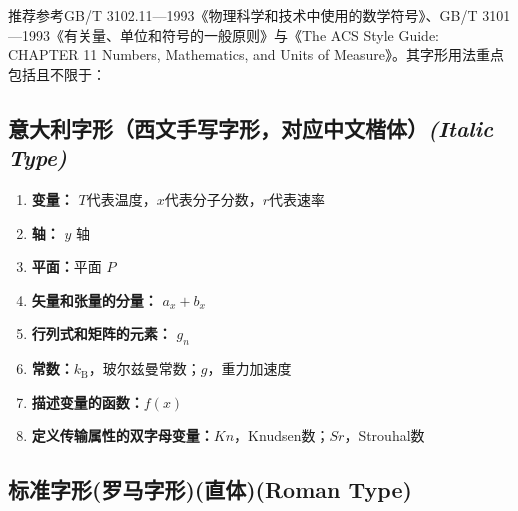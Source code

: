 推荐参考GB/T 3102.11—1993《物理科学和技术中使用的数学符号\cite{QuanGuoLiang1993WuLiKeXueHeJiShuZhongShiYongDeShuXueFuHao}》、GB/T 3101—1993《有关量、单位和符号的一般原则\cite{QuanGuoLiang1993YouGuanLiangDanWeiHeFuHaoDeYiBanYuanZe}》与《The ACS Style Guide: CHAPTER 11 Numbers, Mathematics, and Units of Measure\cite{Cog2006ACSStyleGuide}》。其字形用法重点包括且不限于：

\subsection{{\kai 意大利字形（西文手写字形，对应中文楷体）}\textit{(Italic Type)}}  

\begin{enumerate}[label=(\arabic*)]
    \item \textbf{变量：} $T$代表温度，$x$代表分子分数，$r$代表速率
    \item \textbf{轴：} $y$ 轴
    \item \textbf{平面：}平面 $P$
    \item \textbf{矢量和张量的分量：} $a_x + b_x$
    \item \textbf{行列式和矩阵的元素：} $g_n$
    \item \textbf{常数：}$k_\mathrm{B}$，玻尔兹曼常数；$g$，重力加速度
    \item \textbf{描述变量的函数：}$f(x)$
    \item \textbf{定义传输属性的双字母变量：}$Kn$，Knudsen数；$Sr$，Strouhal数
\end{enumerate}


\subsection{\song 标准字形(罗马字形)(直体)(Roman Type)}

